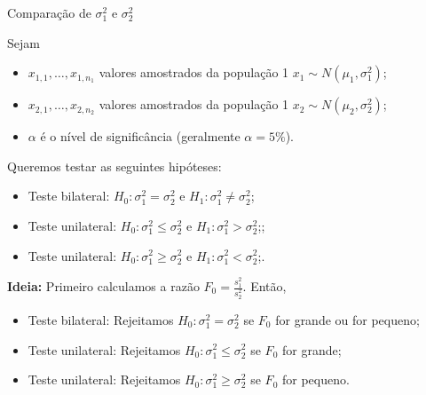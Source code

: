 \documentclass[9pt]{beamer}
\begin{document}
\begin{frame}{Comparação de $\sigma_1^2$ e $\sigma_2^2$}

Sejam
\begin{itemize}
	\item $x_{1,1}, \dots, x_{1, n_1}$ valores amostrados da população 1 $x_1 \sim N(\mu_1, \sigma_1^2)$;
	\item $x_{2,1}, \dots, x_{2, n_2}$ valores amostrados da população 1 $x_2 \sim N(\mu_2, \sigma_2^2)$;
	\item $\alpha$ é o nível de significância (geralmente $\alpha=5\%$). 
\end{itemize}
\vfill

Queremos testar as seguintes hipóteses:
\begin{itemize}
	\item Teste bilateral: $H_0:\sigma_1^2 = \sigma_2^2$ e $H_1: \sigma_1^2 \neq \sigma_2^2$;
	\item Teste unilateral: $H_0:\sigma_1^2 \leq \sigma_2^2$ e $H_1: \sigma_1^2 > \sigma_2^2$;;
	\item Teste unilateral: $H_0:\sigma_1^2 \geq \sigma_2^2$ e $H_1: \sigma_1^2 < \sigma_2^2$;.
\end{itemize}
\vfill

\textbf{Ideia:} Primeiro calculamos a razão $F_0=\frac{s_1^2}{s_2^2}$. Então, 
\begin{itemize}
	\item Teste bilateral: Rejeitamos $H_0:\sigma_1^2 = \sigma_2^2$ se $F_0$ for grande ou for pequeno;
	\item Teste unilateral: Rejeitamos $H_0:\sigma_1^2 \leq \sigma_2^2$ se $F_0 $ for grande;
	\item Teste unilateral: Rejeitamos $H_0:\sigma_1^2 \geq \sigma_2^2$ se $F_0 $ for pequeno.
\end{itemize}
\end{frame}
\end{document}
